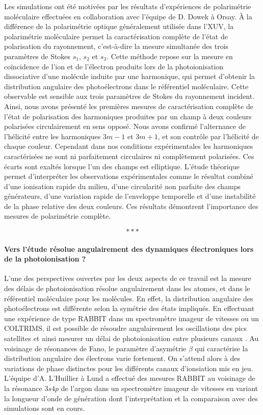 Les simulations ont été motivées par les résultats d'expériences de polarimétrie moléculaire effectuées en collaboration avec l'équipe de D. Dowek à Orsay. \`{A} la différence de la polarimétrie optique généralement utilisée dans l'XUV, la polarimétrie moléculaire permet la caractérisation complète de l'état de polarisation du rayonnement, c'est-à-dire la mesure simultanée des trois paramètres de Stokes $s_1$, $s_2$ et $s_3$. Cette méthode repose sur la mesure en coïncidence de l'ion et de l'électron produits lors de la photoionisation dissociative d'une molécule induite par une harmonique, qui permet d'obtenir la distribution angulaire des photoélectrons dans le référentiel moléculaire. Cette observable est sensible aux trois paramètres de Stokes du rayonnement incident. Ainsi, nous avons présenté les premières mesures de caractérisation complète de l'état de polarisation des harmoniques produites par un champ à deux couleurs polarisées circulairement en sens opposé. Nous avons confirmé l'alternance de l'hélicité entre les harmoniques $3m-1$ et $3m+1$, et son contrôle par l'hélicité de chaque couleur. Cependant dans nos conditions expérimentales les harmoniques caractérisées ne sont ni parfaitement circulaires ni complètement polarisées. Ces écarts sont exaltés lorsque l'un des champs est elliptique. L'étude théorique permet d'interpréter les observations expérimentales comme le résultat combiné d'une ionisation rapide du milieu, d'une circularité non parfaite des champs générateurs, d'une variation rapide de l'enveloppe temporelle et d'une instabilité de la phase relative des deux couleurs. Ces résultats démontrent l'importance des mesures de polarimétrie complète.

\begin{equation*}
\ast \ast \ast
\end{equation*}

\paragraph*{Vers l'étude résolue angulairement des dynamiques électroniques lors de la photoionisation ?} L'une des perspectives ouvertes par les deux aspects de ce travail est la mesure des délais de photoionisation résolue angulairement dans les atomes, et dans le référentiel moléculaire pour les molécules. En effet, la distribution angulaire des photoélectrons est différente selon la symétrie des états impliqués. En effectuant une expérience de type RABBIT dans un spectromètre imageur de vitesses ou un COLTRIMS, il est possible de résoudre angulairement les oscillations des pics satellites et ainsi mesurer un délai de photoionisation entre plusieurs canaux . Au voisinage de résonances de Fano, le paramètre d'asymétrie $\beta$ qui caractérise la distribution angulaire des électrons varie fortement. On s'attend alors à des variations de phase distinctes pour les différents canaux d'ionsiation mis en jeu. L'équipe d'A. L'Huillier à Lund a effectué des mesures RABBIT au voisinage de la résonance $3s4p$ de l'argon dans un spectromètre imageur de vitesses en variant la longueur d'onde de génération  dont l'interprétation et la comparaison avec des simulations sont en cours. 

